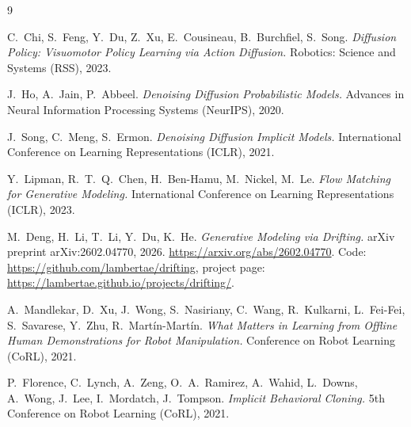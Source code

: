 \documentclass[11pt]{article}
\begin{document}
\begin{thebibliography}{9}

C.~Chi, S.~Feng, Y.~Du, Z.~Xu, E.~Cousineau, B.~Burchfiel, S.~Song.
\textit{Diffusion Policy: Visuomotor Policy Learning via Action Diffusion.}
Robotics: Science and Systems (RSS), 2023.

J.~Ho, A.~Jain, P.~Abbeel.
\textit{Denoising Diffusion Probabilistic Models.}
Advances in Neural Information Processing Systems (NeurIPS), 2020.

J.~Song, C.~Meng, S.~Ermon.
\textit{Denoising Diffusion Implicit Models.}
International Conference on Learning Representations (ICLR), 2021.

Y.~Lipman, R.~T.~Q.~Chen, H.~Ben-Hamu, M.~Nickel, M.~Le.
\textit{Flow Matching for Generative Modeling.}
International Conference on Learning Representations (ICLR), 2023.

M.~Deng, H.~Li, T.~Li, Y.~Du, K.~He.
\textit{Generative Modeling via Drifting.}
arXiv preprint arXiv:2602.04770, 2026.
\url{https://arxiv.org/abs/2602.04770}.
Code: \url{https://github.com/lambertae/drifting},
project page: \url{https://lambertae.github.io/projects/drifting/}.

A.~Mandlekar, D.~Xu, J.~Wong, S.~Nasiriany, C.~Wang, R.~Kulkarni, L.~Fei-Fei,
S.~Savarese, Y.~Zhu, R.~Mart\'{i}n-Mart\'{i}n.
\textit{What Matters in Learning from Offline Human Demonstrations for
Robot Manipulation.}
Conference on Robot Learning (CoRL), 2021.

P.~Florence, C.~Lynch, A.~Zeng, O.~A.~Ramirez, A.~Wahid, L.~Downs, A.~Wong,
J.~Lee, I.~Mordatch, J.~Tompson.
\textit{Implicit Behavioral Cloning.}
5th Conference on Robot Learning (CoRL), 2021.

\end{thebibliography}
\end{document}
